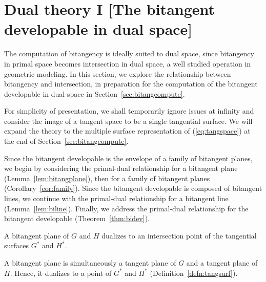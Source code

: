 \documentclass[12pt]{article}
\newif\ifJournal
\begin{document}
\clearpage


\section{Dual theory I [The bitangent developable in dual space]}
\label{sec:bitangdev}

The computation of bitangency is ideally suited to dual space,
since bitangency in primal space becomes intersection in dual space,
a well studied operation in geometric modeling.
In this section, we explore the relationship between bitangency 
and intersection, in preparation for the computation of the bitangent
developable in dual space in Section~\ref{sec:bitangcompute}.

For simplicity of presentation, we shall temporarily ignore issues at infinity
and consider the image of a tangent space to be a single tangential surface.
We will expand the theory to the multiple surface representation of 
(\ref{eq:tangspace}) at the end of Section~\ref{sec:bitangcompute}.

Since the bitangent developable is the envelope of a family of
bitangent planes, we begin by considering the primal-dual relationship
for a bitangent plane (Lemma~\ref{lem:bitangplane}), 
then for a family of bitangent planes (Corollary~\ref{cor:family}).
Since the bitangent developable is composed of bitangent lines,
we continue with the primal-dual relationship for a bitangent line 
(Lemma~\ref{lem:biline}).
Finally, we address the primal-dual relationship for the bitangent developable
(Theorem~\ref{thm:bidev}).

\begin{lemma}
\label{lem:bitangplane}
A bitangent plane of $G$ and $H$ dualizes to an intersection point of
the tangential surfaces $G^*$ and $H^*$.
\ifJournal (Figure~\ref{fig:bitangplane}). \fi
\end{lemma}
\prf
A bitangent plane is simultaneously a tangent plane of $G$ and
a tangent plane of $H$.
Hence, it dualizes to a point of $G^*$ and $H^*$ (Definition~\ref{defn:tangsurf}).
\QED

\ifJournal
\begin{figure}[b]
\vspace{1in}
\caption{A bitangent plane and the associated intersection point in dual space}
\label{fig:bitangplane}
\end{figure}
\fi
\end{document}

